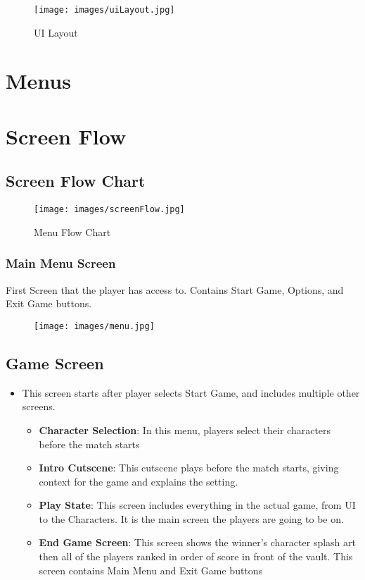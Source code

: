 \documentclass[10pt]{report}
\begin{document}
\begin{figure}[H]
	\texttt{[image: images/uiLayout.jpg]}
    \caption{UI Layout}
    \label{fig:uilayout}
\end{figure}

\section{Menus}

\section{Screen Flow}

\subsection{Screen Flow Chart}

\begin{figure}[H]
    \centering
    \texttt{[image: images/screenFlow.jpg]}
    \caption{Menu Flow Chart}
\end{figure}

\subsubsection{Main Menu Screen}

First Screen that the player has access to. Contains Start Game, Options, and Exit Game buttons.

\begin{figure}[H]
    \centering
    \texttt{[image: images/menu.jpg]}
    \caption{}
\end{figure}

\subsection{Game Screen}

\begin{itemize}
    \item This screen starts after player selects Start Game, and includes multiple other screens.
    \begin{itemize}    
        \item \textbf{Character Selection}: In this menu, players select their characters before the match starts
        \item \textbf{Intro Cutscene}: This cutscene plays before the match starts, giving context for the game and explains the setting.
        \item \textbf{Play State}: This screen includes everything in the actual game, from UI to the Characters. It is the main screen the players are going to be on.
        \item \textbf{End Game Screen}: This screen shows the winner’s character splash art then all of the players ranked in order of score in front of the vault. This screen contains Main Menu and Exit Game buttons
    \end{itemize}
\end{itemize}
\end{document}
